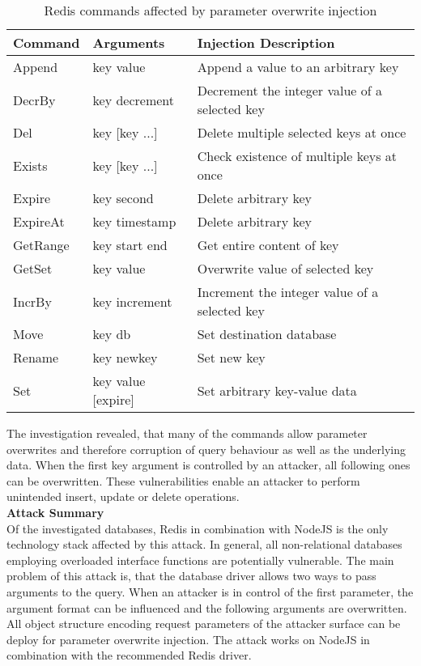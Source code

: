 \begin{table}[h]
 \sffamily
 \centering
 \begin{tabular}{lll}
  \textbf{Command} & \textbf{Arguments} & \textbf{Injection Description} \\ \hline
  Append  & key value       & Append a value to an arbitrary key\\
  DecrBy  & key decrement   & Decrement the integer value of a selected key \\
  Del     & key [key ...]   & Delete multiple selected keys at once \\
  Exists  & key [key ...]   & Check existence of multiple keys at once \\
  Expire  & key second      & Delete arbitrary key \\
  ExpireAt& key timestamp & Delete arbitrary key \\
  GetRange& key start end & Get entire content of key \\
  GetSet  & key value & Overwrite value of selected key \\
  IncrBy  & key increment & Increment the integer value of a selected key \\
  Move    & key db & Set destination database \\
  Rename  & key newkey & Set new key \\
  Set     & key value [expire] & Set arbitrary key-value data \\
  \bottomrule 
 \end{tabular}
 \caption{Redis commands affected by parameter overwrite injection}
 \label{tab:redis_commands_affected}
\end{table}

The investigation revealed, that many of the commands allow parameter overwrites and therefore corruption of query behaviour as well as the underlying data. When the first key argument is controlled by an attacker, all following ones can be overwritten. These vulnerabilities enable an attacker to perform unintended insert, update or delete operations. \\

\textbf{Attack Summary} \\
Of the investigated databases, Redis in combination with NodeJS is the only technology stack affected by this attack. In general, all non-relational databases employing overloaded interface functions are potentially vulnerable. The main problem of this attack is, that the database driver allows two ways to pass arguments to the query. When an attacker is in control of the first parameter, the argument format can be influenced and the following arguments are overwritten. All object structure encoding request parameters of the attacker surface can be deploy for parameter overwrite injection. The attack works on NodeJS in combination with the recommended Redis driver. 

